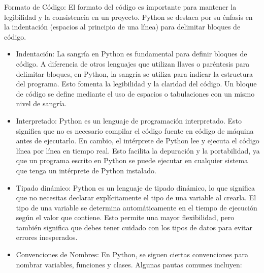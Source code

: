 Formato de Código: El formato del código es importante para mantener la legibilidad y la consistencia en un proyecto. Python se destaca por su énfasis en la indentación (espacios al principio de una línea) para delimitar bloques de código. 
\begin{itemize}
    \item Indentación: La sangría en Python es fundamental para definir bloques de código. A diferencia de otros lenguajes que utilizan llaves o paréntesis para delimitar bloques, en Python, la sangría se utiliza para indicar la estructura del programa. Esto fomenta la legibilidad y la claridad del código. Un bloque de código se define mediante el uso de espacios o tabulaciones con un mismo nivel de sangría. 
    \item Interpretado: Python es un lenguaje de programación interpretado. Esto significa que no es necesario compilar el código fuente en código de máquina antes de ejecutarlo. En cambio, el intérprete de Python lee y ejecuta el código línea por línea en tiempo real. Esto facilita la depuración y la portabilidad, ya que un programa escrito en Python se puede ejecutar en cualquier sistema que tenga un intérprete de Python instalado.
    \item Tipado dinámico: Python es un lenguaje de tipado dinámico, lo que significa que no necesitas declarar explícitamente el tipo de una variable al crearla. El tipo de una variable se determina automáticamente en el tiempo de ejecución según el valor que contiene. Esto permite una mayor flexibilidad, pero también significa que debes tener cuidado con los tipos de datos para evitar errores inesperados. 
    \item Convenciones de Nombres: En Python, se siguen ciertas convenciones para nombrar variables, funciones y clases. Algunas pautas comunes incluyen:


\end{itemize}
